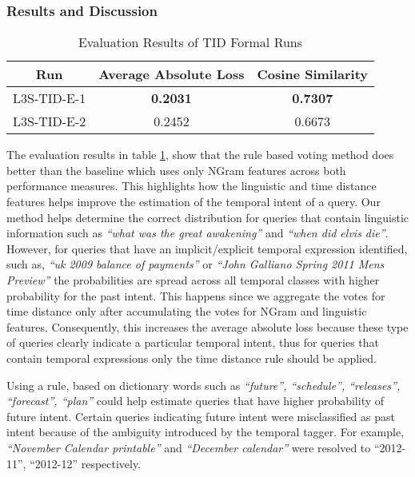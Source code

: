 \documentclass{sig-alternate}
\begin{document}
\subsubsection{Results and Discussion}\label{sec:tid results}
\begin{table}[htbp]
\centering
\begin{tabular}{|c|c|c|}
\hline
Run & Average Absolute Loss & Cosine Similarity \\
\hline
\hline
L3S-TID-E-1 & \textbf{0.2031} & \textbf{0.7307} \\
\hline
L3S-TID-E-2 & 0.2452 & 0.6673 \\
\hline
\end{tabular}  
\caption{Evaluation Results of TID Formal Runs}
\label{table:1}
\end{table}
The evaluation results in \textsf{table \ref{table:1}}, show that the \textsf{rule based voting} method does better than the baseline which uses only \textsf{NGram features} across both performance measures. This highlights how the \textsf{linguistic} and \textsf{time distance} features helps improve the estimation of the temporal intent of a query. Our method helps determine the correct distribution for queries that contain linguistic information such as \textit{``what was the great awakening''} and \textit{``when did elvis die''}. However, for queries that have an implicit/explicit temporal expression identified, such as, \textit{``uk 2009 balance of payments''} or \textit{``John Galliano Spring 2011 Mens Preview''} the probabilities are spread across all temporal classes with higher probability for the past intent. This happens since we aggregate the votes for time distance only after accumulating the votes for NGram and linguistic features. Consequently, this increases the average absolute loss because these type of queries clearly indicate a particular temporal intent, thus for queries that contain temporal expressions only the time distance rule should be applied. 

Using a rule, based on dictionary words such as \textit{``future'', ``schedule'', ``releases'', ``forecast'', ``plan''} could help estimate queries that have higher probability of future intent. Certain queries indicating future intent were misclassified as past intent because of the ambiguity introduced by the temporal tagger. For example, \textit{``November Calendar printable''} and \textit{``December calendar''} were resolved to ``2012-11'', ``2012-12'' respectively. 
\end{document}
